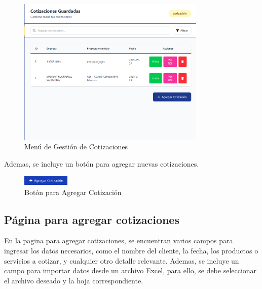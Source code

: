 \documentclass{Pretexto/bluereport}
\begin{document}
\begin{minipage}
\begin{figure}[H]
    \centering
    \includegraphics[width=0.8\textwidth]{img/gestion_cotizaciones.png}
    \caption{Menú de Gestión de Cotizaciones}
    \label{fig:gestion_cotizaciones}
\end{figure}

Ademas, se incluye un botón para agregar nuevas cotizaciones.

\begin{figure}[H]
    \centering
    \includegraphics[width=0.2\textwidth]{img/agregar_cotizacion.png}
    \caption{Botón para Agregar Cotización}
    \label{fig:agregar_cotizacion}
\end{figure}

\subsection{Página para agregar cotizaciones}

En la pagina para agregar cotizaciones, se encuentran varios campos para ingresar los datos necesarios, 
como el nombre del cliente, la fecha, los productos o servicios a cotizar, y cualquier otro detalle relevante.
Ademas, se incluye un campo para importar datos desde un archivo Excel, para ello, se debe seleccionar el archivo 
deseado y la hoja correspondiente.


\end{minipage}
\end{document}
